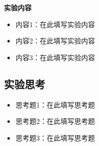\documentclass[a4paper]{article}
\begin{document}
\noindent \textbf{实验内容}
\begin{itemize}
    \item 内容1：在此填写实验内容
    \item 内容2：在此填写实验内容
    \item 内容3：在此填写实验内容
\end{itemize}



\subsection{实验思考}
\begin{itemize}
    \item 思考题1：在此填写思考题
    \item 思考题2：在此填写思考题
    \item 思考题3：在此填写思考题
\end{itemize}
\end{document}
